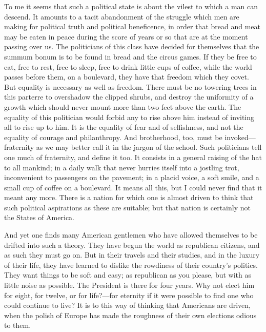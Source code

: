 To me it seems that such a political state is about the vilest to
which a man can descend.  It amounts to a tacit abandonment of the
struggle which men are making for political truth and political
beneficence, in order that bread and meat may be eaten in peace
during the score of years or so that are at the moment passing over
us.  The politicians of this class have decided for themselves that
the summum bonum is to be found in bread and the circus games.  If
they be free to eat, free to rest, free to sleep, free to drink
little cups of coffee, while the world passes before them, on a
boulevard, they have that freedom which they covet.  But equality
is necessary as well as freedom.  There must be no towering trees
in this parterre to overshadow the clipped shrubs, and destroy the
uniformity of a growth which should never mount more than two feet
above the earth.  The equality of this politician would forbid any
to rise above him instead of inviting all to rise up to him.  It is
the equality of fear and of selfishness, and not the equality of
courage and philanthropy.  And brotherhood, too, must be invoked---%
fraternity as we may better call it in the jargon of the school.
Such politicians tell one much of fraternity, and define it too.
It consists in a general raising of the hat to all mankind; in a
daily walk that never hurries itself into a jostling trot,
inconvenient to passengers on the pavement; in a placid voice, a
soft smile, and a small cup of coffee on a boulevard.  It means all
this, but I could never find that it meant any more.  There is a
nation for which one is almost driven to think that such political
aspirations as these are suitable; but that nation is certainly not
the States of America.

And yet one finds many American gentlemen who have allowed
themselves to be drifted into such a theory.  They have begun the
world as republican citizens, and as such they must go on.  But in
their travels and their studies, and in the luxury of their life,
they have learned to dislike the rowdiness of their country's
politics.  They want things to be soft and easy; as republican as
you please, but with as little noise as possible.  The President is
there for four years.  Why not elect him for eight, for twelve, or
for life?---for eternity if it were possible to find one who could
continue to live?  It is to this way of thinking that Americans are
driven, when the polish of Europe has made the roughness of their
own elections odious to them.

